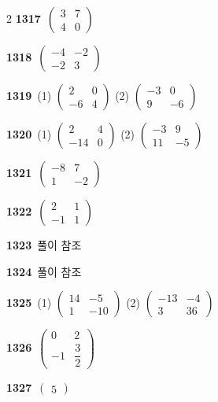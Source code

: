 \documentclass[10pt,a4paper]{article}
\begin{document}
\begin{multicols}{2}
\noindent\textbf{1317}\ $\begin{pmatrix} 3 & 7 \\ 4 & 0 \end{pmatrix}$\par
\noindent\textbf{1318}\ $\begin{pmatrix} -4 & -2 \\ -2 & 3 \end{pmatrix}$\par
\noindent\textbf{1319}\ (1) $\begin{pmatrix} 2 & 0 \\ -6 & 4 \end{pmatrix}$ (2) $\begin{pmatrix} -3 & 0 \\ 9 & -6 \end{pmatrix}$\par
\noindent\textbf{1320}\ (1) $\begin{pmatrix} 2 & 4 \\ -14 & 0 \end{pmatrix}$ (2) $\begin{pmatrix} -3 & 9 \\ 11 & -5 \end{pmatrix}$\par
\noindent\textbf{1321}\ $\begin{pmatrix} -8 & 7 \\ 1 & -2 \end{pmatrix}$\par
\noindent\textbf{1322}\ $\begin{pmatrix} 2 & 1 \\ -1 & 1 \end{pmatrix}$\par
\noindent\textbf{1323}\ 풀이 참조\par
\noindent\textbf{1324}\ 풀이 참조\par
\noindent\textbf{1325}\ (1) $\begin{pmatrix} 14 & -5 \\ 1 & -10 \end{pmatrix}$ (2) $\begin{pmatrix} -13 & -4 \\ 3 & 36 \end{pmatrix}$\par
\noindent\textbf{1326}\ $\begin{pmatrix} 0 & 2 \\ -1 & \dfrac{3}{2} \end{pmatrix}$\par
\noindent\textbf{1327}\ $\begin{pmatrix} 5 \end{pmatrix}$\par

\end{multicols}
\end{document}

